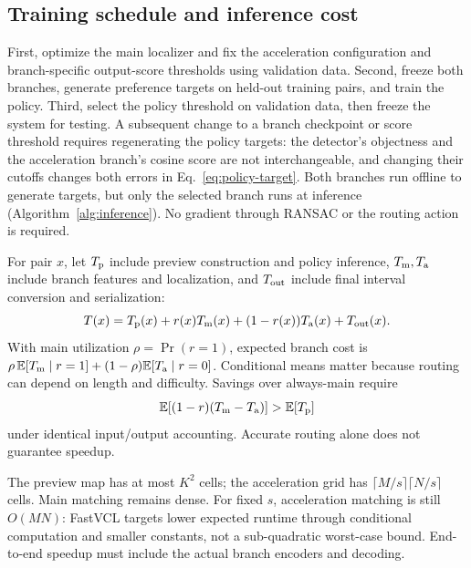 \subsection{Training schedule and inference cost}
\label{sec:cost}
First, optimize the main localizer and fix the acceleration configuration and branch-specific
output-score thresholds using validation data. Second, freeze both branches, generate
preference targets on held-out training pairs, and train the policy. Third, select the policy
threshold on validation data, then freeze the system for testing. A subsequent change to a
branch checkpoint or score threshold requires regenerating the policy targets: the detector's
objectness and the acceleration branch's cosine score are not interchangeable, and changing
their cutoffs changes both errors in Eq.~\ref{eq:policy-target}. Both branches run offline
to generate targets, but only the selected branch runs at inference
(Algorithm~\ref{alg:inference}). No gradient through RANSAC or the routing action is required.

For pair $x$, let $T_{\rm p}$ include preview construction and policy inference,
$T_{\rm m},T_{\rm a}$ include branch features and localization, and $T_{\rm out}$ include
final interval conversion and serialization:
\begin{equation}
T(x)=T_{\rm p}(x)+r(x)T_{\rm m}(x)
+(1-r(x))T_{\rm a}(x)+T_{\rm out}(x).
\label{eq:cost}
\end{equation}
With main utilization $\rho=\Pr(r=1)$, expected branch cost is
$\rho\,\mathbb E[T_{\rm m}\mid r=1]+(1-\rho)\mathbb E[T_{\rm a}\mid r=0]$.
Conditional means matter because routing can depend on length and difficulty.
Savings over always-main require
\begin{equation}
\mathbb E[(1-r)(T_{\rm m}-T_{\rm a})]>\mathbb E[T_{\rm p}]
\label{eq:break-even}
\end{equation}
under identical input/output accounting. Accurate routing alone does not guarantee speedup.

The preview map has at most $K^2$ cells; the acceleration grid has
$\lceil M/s\rceil\lceil N/s\rceil$ cells. Main matching remains dense. For fixed $s$,
acceleration matching is still $O(MN)$: FastVCL targets lower expected runtime through
conditional computation and smaller constants, not a sub-quadratic worst-case bound.
End-to-end speedup must include the actual branch encoders and decoding.

